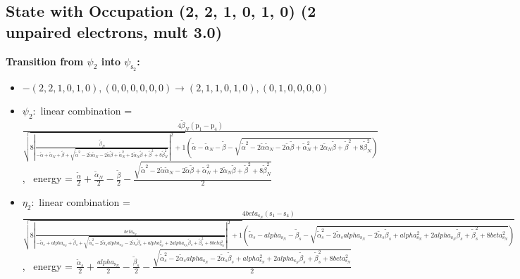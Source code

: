 \documentclass[12pt,a4paper]{article}
\begin{document}
\subsection*{State with Occupation (2, 2, 1, 0, 1, 0) (2 unpaired electrons, mult 3.0)}
        \noindent\textbf{Transition from $\psi_{2}$ into $\psi_{\text{s}_{2}}$:}
        \begin{itemize}
            \item $- (2, 2, 1, 0, 1, 0), (0, 0, 0, 0, 0, 0) \rightarrow (2, 1, 1, 0, 1, 0), (0, 1, 0, 0, 0, 0)$
        
            \item $\psi_{2}:$ linear combination = $\frac{4 \tilde{\beta}_{N} \left(\text{p}_{1} - \text{p}_{4}\right)}{\sqrt{8 \left|{\frac{\tilde{\beta}_{N}}{- \tilde{\alpha} + \tilde{\alpha}_{N} + \tilde{\beta} + \sqrt{\tilde{\alpha}^{2} - 2 \tilde{\alpha} \tilde{\alpha}_{N} - 2 \tilde{\alpha} \tilde{\beta} + \tilde{\alpha}_{N}^{2} + 2 \tilde{\alpha}_{N} \tilde{\beta} + \tilde{\beta}^{2} + 8 \tilde{\beta}_{N}^{2}}}}\right|^{2} + 1} \left(\tilde{\alpha} - \tilde{\alpha}_{N} - \tilde{\beta} - \sqrt{\tilde{\alpha}^{2} - 2 \tilde{\alpha} \tilde{\alpha}_{N} - 2 \tilde{\alpha} \tilde{\beta} + \tilde{\alpha}_{N}^{2} + 2 \tilde{\alpha}_{N} \tilde{\beta} + \tilde{\beta}^{2} + 8 \tilde{\beta}_{N}^{2}}\right)}$, \
            energy = $\frac{\tilde{\alpha}}{2} + \frac{\tilde{\alpha}_{N}}{2} - \frac{\tilde{\beta}}{2} - \frac{\sqrt{\tilde{\alpha}^{2} - 2 \tilde{\alpha} \tilde{\alpha}_{N} - 2 \tilde{\alpha} \tilde{\beta} + \tilde{\alpha}_{N}^{2} + 2 \tilde{\alpha}_{N} \tilde{\beta} + \tilde{\beta}^{2} + 8 \tilde{\beta}_{N}^{2}}}{2}$
            
            \item $\eta_{2}:$ linear combination = $\frac{4 beta_{\text{s}_N} \left(\text{s}_{1} - \text{s}_{4}\right)}{\sqrt{8 \left|{\frac{beta_{\text{s}_N}}{- \tilde{\alpha}_{s} + alpha_{\text{s}_N} + \tilde{\beta}_{s} + \sqrt{\tilde{\alpha}_{s}^{2} - 2 \tilde{\alpha}_{s} alpha_{\text{s}_N} - 2 \tilde{\alpha}_{s} \tilde{\beta}_{s} + alpha_{\text{s}_N}^{2} + 2 alpha_{\text{s}_N} \tilde{\beta}_{s} + \tilde{\beta}_{s}^{2} + 8 beta_{\text{s}_N}^{2}}}}\right|^{2} + 1} \left(\tilde{\alpha}_{s} - alpha_{\text{s}_N} - \tilde{\beta}_{s} - \sqrt{\tilde{\alpha}_{s}^{2} - 2 \tilde{\alpha}_{s} alpha_{\text{s}_N} - 2 \tilde{\alpha}_{s} \tilde{\beta}_{s} + alpha_{\text{s}_N}^{2} + 2 alpha_{\text{s}_N} \tilde{\beta}_{s} + \tilde{\beta}_{s}^{2} + 8 beta_{\text{s}_N}^{2}}\right)}$, \
            energy = $\frac{\tilde{\alpha}_{s}}{2} + \frac{alpha_{\text{s}_N}}{2} - \frac{\tilde{\beta}_{s}}{2} - \frac{\sqrt{\tilde{\alpha}_{s}^{2} - 2 \tilde{\alpha}_{s} alpha_{\text{s}_N} - 2 \tilde{\alpha}_{s} \tilde{\beta}_{s} + alpha_{\text{s}_N}^{2} + 2 alpha_{\text{s}_N} \tilde{\beta}_{s} + \tilde{\beta}_{s}^{2} + 8 beta_{\text{s}_N}^{2}}}{2}$
            

\end{itemize}
\end{document}

